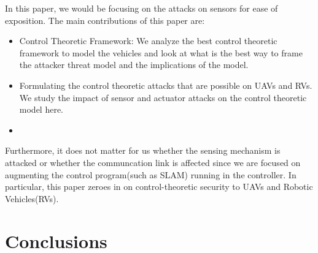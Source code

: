 In this paper, we would be focusing on the attacks on sensors for ease of exposition. The main contributions of this paper are:

\begin{itemize}
    \item Control Theoretic Framework: We analyze the best control theoretic framework to model the vehicles and look at what is the best way to frame the attacker threat model and the implications of the model.
    \item Formulating the control theoretic attacks that are possible on UAVs and RVs. We study the impact of sensor and actuator attacks on the control theoretic model here.
    \item 
\end{itemize}

Furthermore, it does not matter for us whether the sensing mechanism is attacked or whether the communcation link is affected since we are focused on augmenting the control program(such as SLAM) running in the controller. In particular, this paper zeroes in on control-theoretic security to UAVs and Robotic Vehicles(RVs).






\section{Conclusions}


\appendix



%

